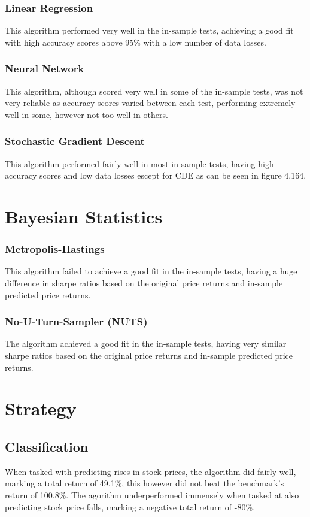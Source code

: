 \subsubsection{Linear Regression} 
This algorithm performed very well in the in-sample tests, achieving a good fit with high accuracy scores above 95\% with a low number of data losses.

\subsubsection{Neural Network}
This algorithm, although scored very well in some of the in-sample tests, was not very reliable as accuracy scores varied between each test, performing extremely well in some, however not too well in others. 

\subsubsection{Stochastic Gradient Descent}
This algorithm performed fairly well in most in-sample tests, having high accuracy scores and low data losses escept for CDE as can be seen in figure 4.164.

\section{Bayesian Statistics}

\subsubsection{Metropolis-Hastings}
This algorithm failed to achieve a good fit in the in-sample tests, having a huge difference in sharpe ratios based on the original price returns and in-sample predicted price returns. 

\subsubsection{No-U-Turn-Sampler (NUTS)}
The algorithm achieved a good fit in the in-sample tests, having very similar sharpe ratios  based on the original price returns and in-sample predicted price returns.

\section{Strategy}

\subsection{Classification}
When tasked with predicting rises in stock prices, the algorithm did fairly well, marking a total return of 49.1\%, this however did not beat the benchmark's return of 100.8\%. The agorithm underperformed immensely when tasked at also predicting stock price falls, marking a negative total return of -80\%.

